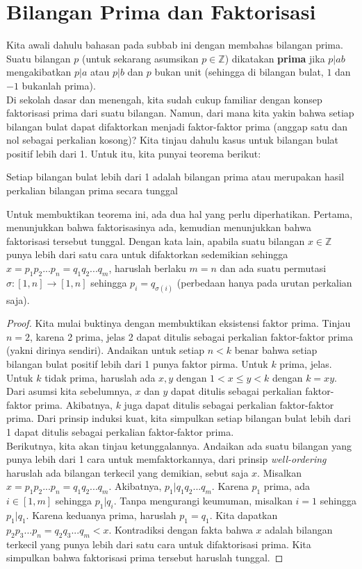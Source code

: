 	\section{Bilangan Prima dan Faktorisasi}
	Kita awali dahulu bahasan pada subbab ini dengan membahas bilangan prima. Suatu bilangan $p$ (untuk sekarang asumsikan $p \in \mathbb{Z}$) dikatakan \textbf{prima} jika $p | ab$ mengakibatkan $p | a$ atau $p | b$ dan $p$ bukan unit (sehingga di bilangan bulat, $1$ dan $-1$ bukanlah prima).\\
	
	Di sekolah dasar dan menengah, kita sudah cukup familiar dengan konsep faktorisasi prima dari suatu bilangan. Namun, dari mana kita yakin bahwa setiap bilangan bulat dapat difaktorkan menjadi faktor-faktor prima (anggap satu dan nol sebagai perkalian kosong)? Kita tinjau dahulu kasus untuk bilangan bulat positif lebih dari 1. Untuk itu, kita punyai teorema berikut:
	\begin{theorem}
		Setiap bilangan bulat lebih dari 1 adalah bilangan prima atau merupakan hasil perkalian bilangan prima secara tunggal
	\end{theorem}
	Untuk membuktikan teorema ini, ada dua hal yang perlu diperhatikan. Pertama, menunjukkan bahwa faktorisasinya ada, kemudian menunjukkan bahwa faktorisasi tersebut tunggal. Dengan kata lain, apabila suatu bilangan $x \in \mathbb{Z}$ punya lebih dari satu cara untuk difaktorkan sedemikian sehingga $x = p_1 p_2 ... p_n = q_1 q_2 ... q_m$, haruslah berlaku $m = n$ dan ada suatu permutasi $\sigma : [1,n] \rightarrow [1,n]$ sehingga $p_i = q_{\sigma{(i)}}$ (perbedaan hanya pada urutan perkalian saja).
	\begin{proof}
		Kita mulai buktinya dengan membuktikan eksistensi faktor prima. Tinjau $n = 2$, karena 2 prima, jelas 2 dapat ditulis sebagai perkalian faktor-faktor prima (yakni dirinya sendiri). Andaikan untuk setiap $n < k$ benar bahwa setiap bilangan bulat positif lebih dari 1 punya faktor pirma. Untuk $k$ prima, jelas. Untuk $k$ tidak prima, haruslah ada $x,y$ dengan $1 < x \le y < k$ dengan $k = xy$. Dari asumsi kita sebelumnya, $x$ dan $y$ dapat ditulis sebagai perkalian faktor-faktor prima. Akibatnya, $k$ juga dapat ditulis sebagai perkalian faktor-faktor prima. Dari prinsip induksi kuat, kita simpulkan setiap bilangan bulat lebih dari 1 dapat ditulis sebagai perkalian faktor-faktor prima.\\
		
		Berikutnya, kita akan tinjau ketunggalannya. Andaikan ada suatu bilangan yang punya lebih dari 1 cara untuk memfaktorkannya, dari prinsip \textit{well-ordering} haruslah ada bilangan terkecil yang demikian, sebut saja $x$. Misalkan $x = p_1 p_2 ... p_n = q_1 q_2 ... q_m$. Akibatnya, $p_1 | q_1 q_2 ... q_m$. Karena $p_1$ prima, ada $i \in [1,m]$ sehingga $p_1 | q_i$. Tanpa mengurangi keumuman, misalkan $i = 1$ sehingga $p_1 | q_1$. Karena keduanya prima, haruslah $p_1 = q_1$. Kita dapatkan $p_2 p_3 ... p_n = q_2 q_3 ... q_m < x$. Kontradiksi dengan fakta bahwa $x$ adalah bilangan terkecil yang punya lebih dari satu cara untuk difaktorisasi prima. Kita simpulkan bahwa faktorisasi prima tersebut haruslah tunggal.
	\end{proof}
